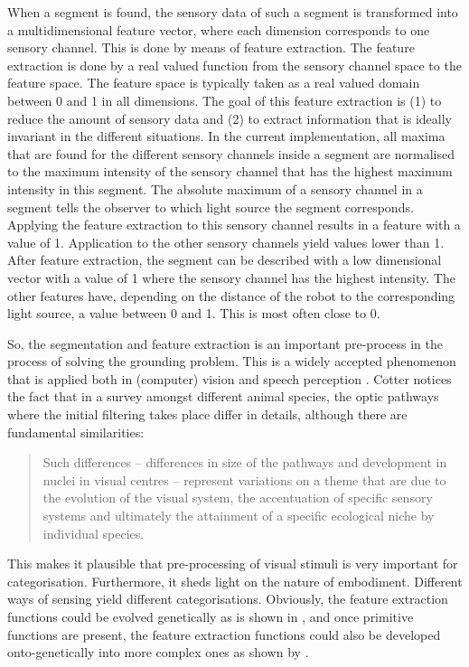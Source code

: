 When a segment is found, the sensory data of such a segment is transformed into a multidimensional feature vector, where each dimension corresponds to one sensory channel. This is done by means of feature extraction. The feature extraction is done by a real valued function from the sensory channel space to the feature space. The feature space is typically taken as a real valued domain between 0 and 1 in all dimensions. The goal of this feature extraction is (1) to reduce the amount of sensory data and (2) to extract information that is ideally invariant in the different situations. In the current implementation, all maxima that are found for the different sensory channels inside a segment are normalised to the maximum intensity of the sensory channel that has the highest maximum intensity in this segment. The absolute maximum of a sensory channel in a segment tells the observer to which light source the segment corresponds. Applying the feature extraction to this sensory channel results in a feature with a value of 1. Application to the other sensory channels yield values lower than 1. After feature extraction, the segment can be described with a low dimensional vector with a value of 1 where the sensory channel has the highest intensity. The other features have, depending on the distance of the robot to the corresponding light source, a value between 0 and 1. This is most often close to 0. 

So, the segmentation and feature extraction is an important pre-process in the process of solving the grounding problem. This is a widely accepted phenomenon that is applied both in (computer) vision \citep{cotter:1990} and speech perception \citep{damper:2000}. Cotter notices the fact that in a survey amongst different animal species, the optic pathways where the initial filtering takes place differ in details, although there are fundamental similarities:

\begin{quote}
Such differences -- differences in size of the pathways and development in nuclei in visual centres -- represent variations on a theme that are due to the evolution of the visual system, the accentuation of specific sensory systems and ultimately the attainment of a specific ecological niche by individual species. \citep[11]{cotter:1990}
\end{quote}

This makes it plausible that pre-processing of visual stimuli is very important for categorisation. Furthermore, it sheds light on the nature of embodiment. Different ways of sensing yield different categorisations. Obviously, the feature extraction functions could be evolved genetically as is shown in \citealt{belpaeme:1999}, and once primitive functions are present, the feature extraction functions could also be developed onto-genetically into more complex ones as shown by \citet{dejong:1999}. 


